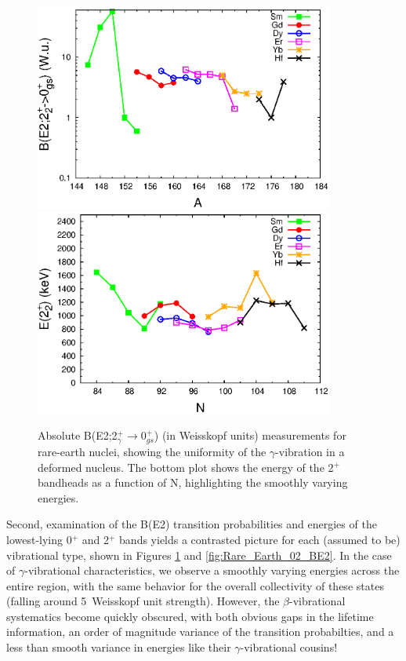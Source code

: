 \begin{figure}[h!]
\begin{center}
\includegraphics[width=0.88\textwidth]{figures/Rare_Earth_2g_BE2.eps}\\
\includegraphics[width=0.88\textwidth]{figures/Rare_Earth_2g_N.eps}
\end{center}
\caption{Absolute B(E2;2$^+_\gamma\rightarrow$0$^+_{gs}$) (in Weisskopf units) measurements for rare-earth nuclei, showing the uniformity of the $\gamma$-vibration in a deformed nucleus. The bottom plot shows the energy of the 2$^+$ bandheads as a function of N, highlighting the smoothly varying energies. \label{fig:Rare_Earth_2g_BE2}}
\end{figure}

Second, examination of the B(E2) transition probabilities and energies of the lowest-lying 0$^+$ and 2$^+$ bands yields a contrasted picture for each (assumed to be) vibrational type, shown in Figures \ref{fig:Rare_Earth_2g_BE2} and \ref{fig:Rare_Earth_02_BE2}. In the case of $\gamma$-vibrational characteristics, we observe a smoothly varying energies across the entire region, with the same behavior for the overall collectivity of these states (falling around 5~Weisskopf unit strength). However, the $\beta$-vibrational systematics become quickly obscured, with both obvious gaps in the lifetime information, an order of magnitude variance of the transition probabilties, and a less than smooth variance in energies like their $\gamma$-vibrational cousins! 



